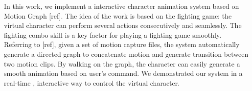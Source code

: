 In this work, we implement a interactive character animation system based on Motion Graph [ref].
The idea of the work is based on the fighting game: the virtual character can perform several actions 
consecutively and seamlessly. 
The fighting combo skill is a key factor for playing a fighting game smoothly.
Referring to [ref], given a set of motion capture files, the system automatically 
generate a directed graph to concatenate motion and generate transition between 
two motion clips.
By walking on the graph, the character can easily generate a smooth animation 
based on user's command.
We demonstrated our system in a real-time , interactive way to control the 
virtual character. 
